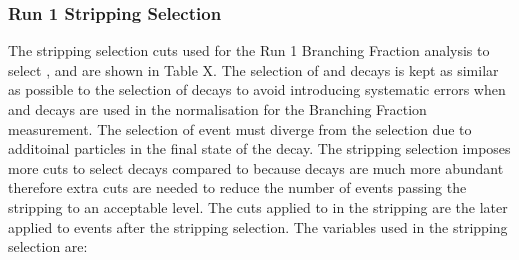 \subsubsection{Run 1 Stripping Selection}
The stripping selection cuts used for the Run 1 \bmumu Branching Fraction analysis \cite{} to select \bmumu, \bhh and \bujpsik are shown in Table X. The selection of \bujpsik and \bhh decays is kept as similar as possible to the selection of \bsmumu decays to avoid introducing systematic errors when \bhh and \bujpsik decays are used in the normalisation for the Branching Fraction measurement. The selection of \bujpsik event must diverge from the \bsmumu selection due to additoinal particles in the final state of the decay. The stripping selection imposes more cuts to select \bhh decays compared to \bsmumu because \bhh decays are much more abundant therefore extra cuts are needed to reduce the number of events passing the stripping to an acceptable level. The cuts applied to \bhh in the stripping are the later applied to \bsmumu events after the stripping selection. 
The variables used in the stripping selection are:
